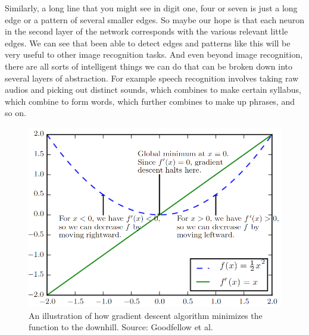 \documentclass[master]{thesis-uestc}
\begin{document}
Similarly, a long line that you might see in digit one, four or seven is just a long edge or a pattern of several smaller edges. So maybe our hope is that each neuron in the second layer of the network corresponds with the various relevant little edges. We can see that been able to detect edges and patterns like this will be very useful to other image recognition tasks. And even beyond image recognition, there are all sorts of intelligent things we can do that can be broken down into several layers of abstraction. For example speech recognition involves taking raw audios and picking out distinct sounds, which combines to make certain syllabus, which combine to form words, which further combines to make up phrases, and so on.

\begin{figure}[ht]
\includegraphics[width=5in]{pic/gradient_descent.PNG}
\caption{An illustration of how gradient descent algorithm minimizes the function to the downhill. Source: Goodfellow et al.}
\label{fig_gradient_descent}
\end{figure}
\end{document}
